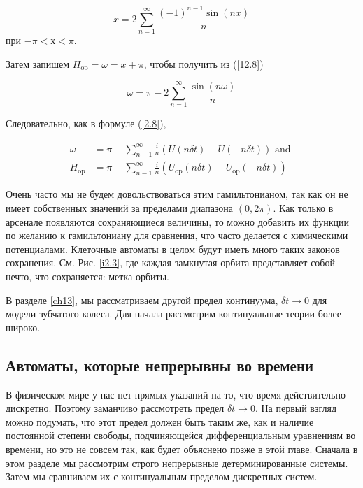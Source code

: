 \documentclass[main.tex]{subfiles}
\begin{document}
\begin{equation}\label{12.8}
	x=2 \sum_{n=1}^{\infty} \frac{(-1)^{n-1} \sin (n x)}{n}
\end{equation}
при $-\pi < х < \pi$.

Затем запишем $H_{\mathrm{op}} = \omega = x + \pi$, чтобы получить из (\ref{12.8})              

\begin{equation}\label{12.9}
	\omega=\pi-2 \sum_{n=1}^{\infty} \frac{\sin (n \omega)}{n}
\end{equation}
           
Следовательно, как в формуле (\ref{2.8}),

\begin{equation}\label{12.10}
	\begin{aligned} \omega &=\pi-\sum_{n-1}^{\infty} \frac{i}{n}(U(n \delta t)-U(-n \delta t)) \text { and } \\ H_{\mathrm{op}} &=\pi-\sum_{n-1}^{\infty} \frac{i}{n}\left(U_{\mathrm{op}}(n \delta t)-U_{\mathrm{op}}(-n \delta t)\right) \end{aligned}
\end{equation}

Очень часто мы не будем довольствоваться этим гамильтонианом, так как он не имеет собственных значений за пределами диапазона $(0,2\pi)$. Как только в арсенале появляются сохраняющиеся величины, то можно добавить их функции по желанию к гамильтониану для сравнения, что часто делается с химическими потенциалами. Клеточные автоматы в целом будут иметь много таких законов сохранения. См. Рис. \ref{i2.3}, где каждая замкнутая орбита представляет собой нечто, что сохраняется: метка орбиты.

В разделе \ref{ch13}, мы рассматриваем другой предел континуума, $\delta t \rightarrow 0$ для модели зубчатого колеса. Для начала рассмотрим континуальные теории более широко.

\subsection{Автоматы, которые непрерывны во времени}\label{ch12.3}

В физическом мире у нас нет прямых указаний на то, что время действительно дискретно. Поэтому заманчиво рассмотреть предел $\delta t \rightarrow 0$. На первый взгляд можно подумать, что этот предел должен быть таким же, как и наличие постоянной степени свободы, подчиняющейся дифференциальным уравнениям во времени, но это не совсем так, как будет объяснено позже в этой главе. Сначала в этом разделе мы рассмотрим строго непрерывные детерминированные системы. Затем мы сравниваем их с континуальным пределом дискретных систем.
\end{document}
